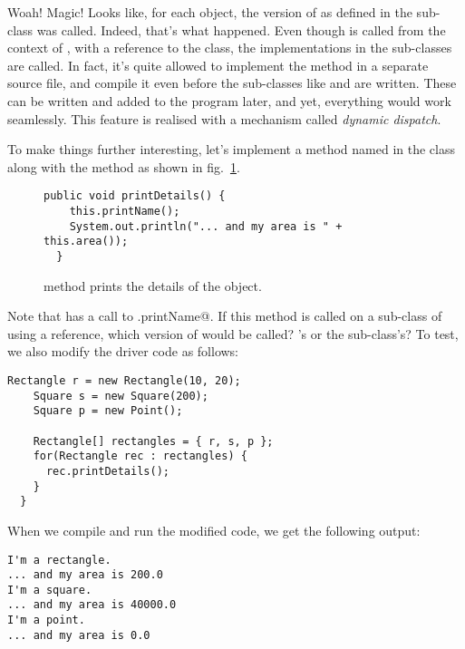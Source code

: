 \documentclass[12pt,a4paper]{article}
\begin{document}
Woah! Magic! Looks like, for each object, the version of \lstinline@printName@ as defined in the sub-class was called. Indeed, that's what happened. Even though \lstinline@printDetails@ is called from the context of \lstinline@main@, with a reference to the \lstinline@Rectangle@ class, the implementations in the sub-classes are called. In fact, it's quite allowed to implement the \lstinline@main@ method in a separate source file, and compile it even before the sub-classes like \lstinline@Square@ and \lstinline@Point@ are written. These can be written and added to the program later, and yet, everything would work seamlessly. This feature is realised with a mechanism called \emph{dynamic dispatch}.

To make things further interesting, let's implement a method named \lstinline@printDetails@ in the \lstinline@Rectangle@ class along with the \lstinline@main@ method as shown in fig.~\ref{f:poly3}.

\begin{figure}[H]
\begin{lstlisting}[frame=single]
  public void printDetails() {
    this.printName();
    System.out.println("... and my area is " + this.area());
  }
\end{lstlisting}
\caption{\lstinline@printDetails@ method prints the details of the object.}
\label{f:poly3}
\end{figure}

Note that \lstinline@printDetails@ has a call to \lstinline@this.printName@. If this method is called on a sub-class of \lstinline@Rectangle@ using a \lstinline@Rectangle@ reference, which version of \lstinline@printName@ would be called? \lstinline@Rectangle@'s or the sub-class's? To test, we also modify the driver code as follows:
\begin{lstlisting}[frame=single]
    Rectangle r = new Rectangle(10, 20);
    Square s = new Square(200);
    Square p = new Point();

    Rectangle[] rectangles = { r, s, p };
    for(Rectangle rec : rectangles) {
      rec.printDetails();
    }
  }
\end{lstlisting}

When we compile and run the modified code, we get the following output:
\begin{lstlisting}[frame=single]
I'm a rectangle.
... and my area is 200.0
I'm a square.
... and my area is 40000.0
I'm a point.
... and my area is 0.0
\end{lstlisting}
\end{document}
